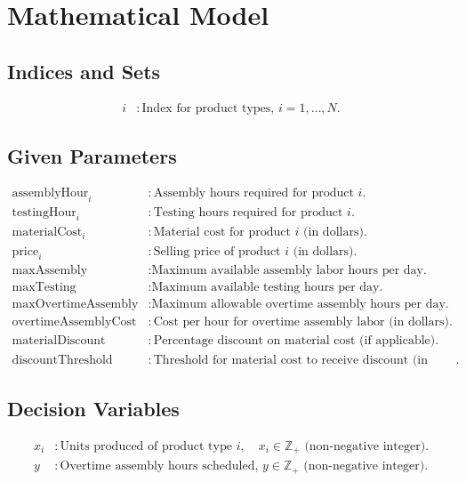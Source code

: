 \documentclass{article}
\begin{document}
\section*{Mathematical Model}

\subsection*{Indices and Sets}
\begin{align*}
i & : \text{Index for product types, } i = 1, \ldots, N.
\end{align*}

\subsection*{Given Parameters}
\begin{align*}
\text{assemblyHour}_i & : \text{Assembly hours required for product } i. \\
\text{testingHour}_i & : \text{Testing hours required for product } i. \\
\text{materialCost}_i & : \text{Material cost for product } i \text{ (in dollars)}. \\
\text{price}_i & : \text{Selling price of product } i \text{ (in dollars)}. \\
\text{maxAssembly} & : \text{Maximum available assembly labor hours per day.} \\
\text{maxTesting} & : \text{Maximum available testing hours per day.} \\
\text{maxOvertimeAssembly} & : \text{Maximum allowable overtime assembly hours per day.} \\
\text{overtimeAssemblyCost} & : \text{Cost per hour for overtime assembly labor (in dollars)}. \\
\text{materialDiscount} & : \text{Percentage discount on material cost (if applicable)}. \\
\text{discountThreshold} & : \text{Threshold for material cost to receive discount (in dollars)}.
\end{align*}

\subsection*{Decision Variables}
\begin{align*}
x_i & : \text{Units produced of product type } i, \quad x_i \in \mathbb{Z}_+ \text{ (non-negative integer)}. \\
y & : \text{Overtime assembly hours scheduled, } y \in \mathbb{Z}_+ \text{ (non-negative integer)}.
\end{align*}
\end{document}
